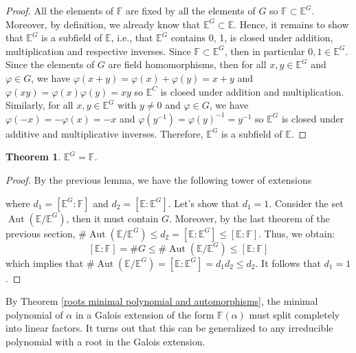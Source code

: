 \documentclass{article}
\theoremstyle{plain}
\newtheorem{theorem}{Theorem}[subsection]
\theoremstyle{definition}
\newcommand{\F}{\mathbb{F}}
\newcommand{\E}{\mathbb{E}}
\DeclareMathOperator{\Aut}{Aut}
\begin{document}
\begin{proof}
    All the elements of $\F$ are fixed by all the elements of $G$ so $\F \subset \E^G$. Moreover, by definition, we already know that $\E^G \subset \E$. Hence, it remains to show that $\E^G$ is a subfield of $\E$, i.e., that $\E^G$ contains 0, 1, is closed under addition, multiplication and respective inverses. Since $\F \subset \E^G$, then in particular $0,1 \in \E^G$. Since the elements of $G$ are field homomorphisms, then for all $x,y \in \E^G$ and $\varphi \in G$, we have $\varphi(x + y) = \varphi(x) + \varphi(y) = x + y$ and $\varphi(xy) = \varphi(x)\varphi(y) = xy$ so $\E^C$ is closed under addition and multiplication. Similarly, for all $x,y \in \E^G$ with $y \neq 0$ and $\varphi \in G$, we have $\varphi(-x) = -\varphi(x) = -x$ and $\varphi(y^{-1}) = \varphi(y)^{-1} = y^{-1}$ so $\E^G$ is closed under additive and multiplicative inverses. Therefore, $\E^G$ is a subfield of $\E$.
\end{proof}

\begin{theorem}
\label{fixed points is ground field of galois}
    $\E^G = \F$.
\end{theorem}

\begin{proof}
    By the previous lemma, we have the following tower of extensions
    \begin{center}
    \end{center}
    where $d_1 = [\E^G : \F]$ and $d_2 = [\E : \E^G]$. Let's show that $d_1 = 1$. Consider the set $\Aut(\E / \E^G)$, then it must contain $G$. Moreover, by the last theorem of the previous section, $\# \Aut(\E / \E^G) \leq d_2 = [\E : \E^G] \leq [\E : \F]$. Thus, we obtain:
    $$[\E : \F] = \# G \leq \# \Aut(\E / \E^G) \leq [\E : \F]$$
    which implies that $\# \Aut(\E / \E^G) = [\E : \E^G] = d_1 d_2 \leq d_2$. It follows that $d_1 = 1$. 
\end{proof}

By Theorem \ref{roots minimal polynomial and automorphisms}, the minimal polynomial of $\alpha$ in a Galois extension of the form $\F(\alpha)$ must split completely into linear factors. It turns out that this can be generalized to any irreducible polynomial with a root in the Galois extension.
\end{document}
